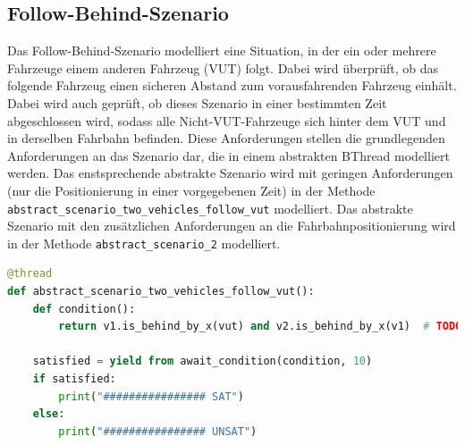 \subsection{Follow-Behind-Szenario}
Das Follow-Behind-Szenario modelliert eine Situation, in der ein oder mehrere Fahrzeuge einem anderen Fahrzeug (VUT) folgt. Dabei wird überprüft, ob das folgende Fahrzeug einen sicheren Abstand zum vorausfahrenden Fahrzeug einhält.
Dabei wird auch geprüft, ob dieses Szenario in einer bestimmten Zeit abgeschlossen wird, sodass alle Nicht-VUT-Fahrzeuge sich hinter dem VUT und in derselben Fahrbahn befinden.
Diese Anforderungen stellen die grundlegenden Anforderungen an das Szenario dar, die in einem abstrakten BThread modelliert werden. Das enstsprechende abstrakte Szenario wird mit geringen Anforderungen (nur die Positionierung in einer vorgegebenen Zeit) in der Methode \texttt{abstract\_scenario\_two\_vehicles\_follow\_vut} modelliert.
Das abstrakte Szenario mit den zusätzlichen Anforderungen an die Fahrbahnpositionierung wird in der Methode \texttt{abstract\_scenario\_2} modelliert.
\begin{lstlisting}[language=Python, caption=bstraktes Szenario: Zwei Fahrzeuge folgen dem VUT, basicstyle=\ttfamily\small]
@thread
def abstract_scenario_two_vehicles_follow_vut():
    def condition():
        return v1.is_behind_by_x(vut) and v2.is_behind_by_x(v1)  # TODO: Same lane?

    satisfied = yield from await_condition(condition, 10)
    if satisfied:
        print("################ SAT")
    else:
        print("################ UNSAT")
\end{lstlisting}

